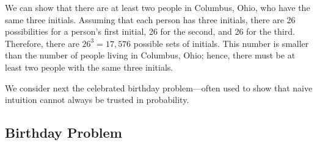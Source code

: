 \begin{example}\label{exam 3.2} We can show that there are at least two people in
Columbus, Ohio, who have the same three initials.  Assuming that each person has three
initials, there are 26 possibilities for a person's first initial, 26 for the second,
and 26 for the third.  Therefore, there are $26^3 = 17{,}576$ possible sets of
initials.  This number is smaller than the number of people living in Columbus, Ohio;
hence, there must be at least two people with the same three initials.
\end{example}

We consider next the celebrated birthday problem---often used to show that naive
intuition cannot always be trusted in probability.

\subsection*{Birthday Problem}

